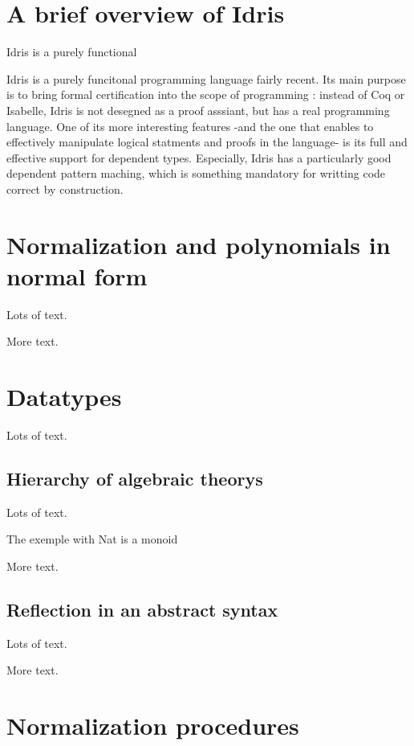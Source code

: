 \documentclass{sigplanconf}
\begin{document}
\section{A brief overview of Idris}
Idris is a purely functional 


Idris is a purely funcitonal programming language fairly recent. Its main purpose is to bring formal certification into the scope of programming : instead of Coq or Isabelle, Idris is not desegned as a proof asssiant, but has a real programming language. One of its more interesting features -and the one that enables to effectively manipulate logical statments and proofs in the language- is its full and effective support for dependent types. Especially, Idris has a particularly good dependent pattern maching, which is something mandatory for writting code correct by construction.




\section{Normalization and polynomials in normal form}
Lots of text.

More text.

\section{Datatypes}

Lots of text.

\subsection{Hierarchy of algebraic theorys}

Lots of text.

The exemple with Nat is a monoid

More text.

\subsection{Reflection in an abstract syntax}

Lots of text.

More text. 

\section{Normalization procedures}
\end{document}
